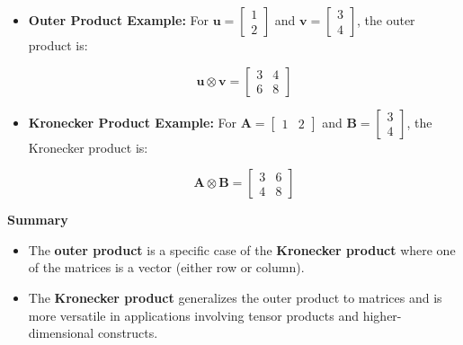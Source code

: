 \documentclass[
  letterpaper,
  DIV=11,
  numbers=noendperiod]{scrreprt}
\providecommand{\tightlist}{%
  \setlength{\itemsep}{0pt}\setlength{\parskip}{0pt}}\usepackage{longtable,booktabs,array}
\theoremstyle{plain}
\theoremstyle{definition}
\theoremstyle{remark}
\begin{document}
\begin{enumerate}
  \begin{itemize}
  \item
    \textbf{Outer Product Example:} For
    \(\mathbf{u} = \begin{bmatrix}1\\2\end{bmatrix}\) and
    \(\mathbf{v} = \begin{bmatrix}3\\4\end{bmatrix}\), the outer product
    is:

    \[
    \mathbf{u} \otimes \mathbf{v} = \begin{bmatrix}3 & 4 \\ 6 & 8\end{bmatrix}
    \]
  \item
    \textbf{Kronecker Product Example:} For
    \(\mathbf{A} = \begin{bmatrix}1&2\end{bmatrix}\) and
    \(\mathbf{B} = \begin{bmatrix}3\\4\end{bmatrix}\), the Kronecker
    product is:

    \[
    \mathbf{A} \otimes \mathbf{B} = \begin{bmatrix}3 & 6 \\ 4 & 8\end{bmatrix}
    \]
  \end{itemize}
\end{enumerate}

\begin{tcolorbox}[enhanced jigsaw, opacityback=0, leftrule=.75mm, bottomrule=.15mm, titlerule=0mm, colback=white, rightrule=.15mm, coltitle=black, left=2mm, breakable, bottomtitle=1mm, toptitle=1mm, colbacktitle=quarto-callout-note-color!10!white, title=\textcolor{quarto-callout-note-color}{\faInfo}\hspace{0.5em}{Note}, arc=.35mm, toprule=.15mm, opacitybacktitle=0.6, colframe=quarto-callout-note-color-frame]

\textbf{Summary}

\begin{itemize}
\tightlist
\item
  The \textbf{outer product} is a specific case of the \textbf{Kronecker
  product} where one of the matrices is a vector (either row or column).
\item
  The \textbf{Kronecker product} generalizes the outer product to
  matrices and is more versatile in applications involving tensor
  products and higher-dimensional constructs.
\end{itemize}

\end{tcolorbox}
\end{document}
